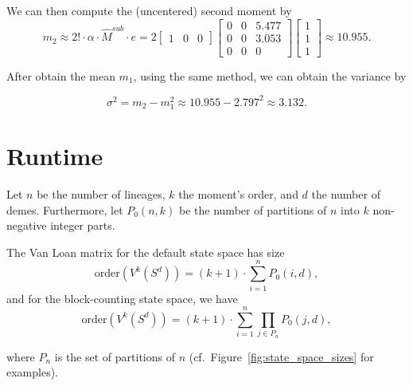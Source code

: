 \documentclass[hidelinks,11pt]{article}
\begin{document}
    We can then compute the (uncentered) second moment by
    \begin{equation*}
        m_2 \approx 2! \cdot \alpha \cdot \hat{M}^{sub}\cdot e = 2 \left [
            \begin{array}{ccc}
                1 & 0 & 0
            \end{array}
            \right ] \left [
            \begin{array}{ccc}
                0 & 0 & 5.477 \\
                0 & 0 & 3.053 \\
                0 & 0 & 0
            \end{array}
            \right ] \left [
            \begin{array}{c}
                1 \\ 1 \\ 1
            \end{array}
            \right ] \approx 10.955.
    \end{equation*}

    After obtain the mean $m_1$, using the same method, we can obtain the variance by

    \begin{equation*}
        \sigma^2 = m_2 - m_1^2 \approx 10.955 - 2.797^2 \approx 3.132.
    \end{equation*}


    \section{Runtime}\label{sec:runtime}

    Let $n$ be the number of lineages, $k$ the moment's order, and $d$ the number of demes.
    Furthermore, let $P_0(n, k)$ be the number of partitions of $n$ into $k$ non-negative integer parts. %

    The Van Loan matrix for the default state space has size
    \begin{equation*}
        \text{order}(V^k(S^d)) = (k + 1) \cdot \sum_{i=1}^{n} P_0(i, d),
    \end{equation*}
    and for the block-counting state space, we have
    \begin{equation*}
        \text{order}(V^k(S^d)) = (k + 1) \cdot \sum_{i=1}^{n} \prod_{j \in P_n} P_0(j, d),
    \end{equation*}

    where $P_n$ is the set of partitions of $n$ (cf.\ Figure~\ref{fig:state_space_sizes} for examples).
\end{document}
